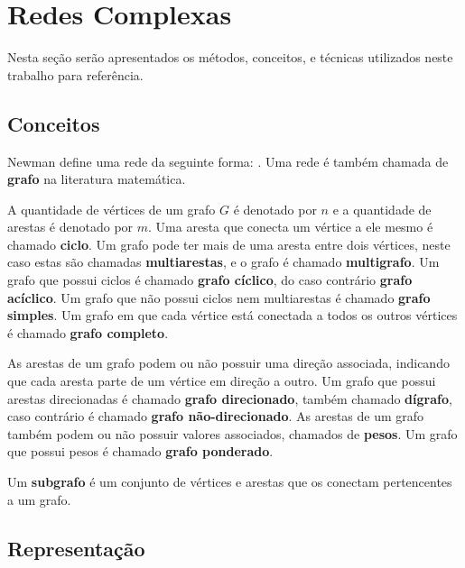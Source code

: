 
\section{Redes Complexas}
\label{section:metodologia:redes}

Nesta seção serão apresentados os métodos, conceitos, e técnicas utilizados neste trabalho para referência.

\subsection{Conceitos}
\label{section:metodologia:redes:conceitos}

Newman \cite{newman:2018:networks} define uma rede da seguinte forma: .  Uma rede é também chamada de \textbf{grafo} na literatura matemática.

A quantidade de vértices de um grafo $G$ é denotado por $n$ e a quantidade de arestas é denotado por $m$. Uma aresta que conecta um vértice a ele mesmo é chamado \textbf{ciclo}. Um grafo pode ter mais de uma aresta entre dois vértices, neste caso estas são chamadas \textbf{multiarestas}, e o grafo é chamado \textbf{multigrafo}. Um grafo que possui ciclos é chamado \textbf{grafo cíclico}, do caso contrário \textbf{grafo acíclico}. Um grafo que não possui ciclos nem multiarestas é chamado \textbf{grafo simples}. Um grafo em que cada vértice está conectada a todos os outros vértices é chamado \textbf{grafo completo}.

As arestas de um grafo podem ou não possuir uma direção associada, indicando que cada aresta parte de um vértice em direção a outro. Um grafo que possui arestas direcionadas é chamado \textbf{grafo direcionado}, também chamado \textbf{dígrafo}, caso contrário é chamado \textbf{grafo não-direcionado}. As arestas de um grafo também podem ou não possuir valores associados, chamados de \textbf{pesos}. Um grafo que possui pesos é chamado \textbf{grafo ponderado}.

Um \textbf{subgrafo} é um conjunto de vértices e arestas que os conectam pertencentes a um grafo.

\subsection{Representação}
\label{section:metodologia:redes:representacao}

